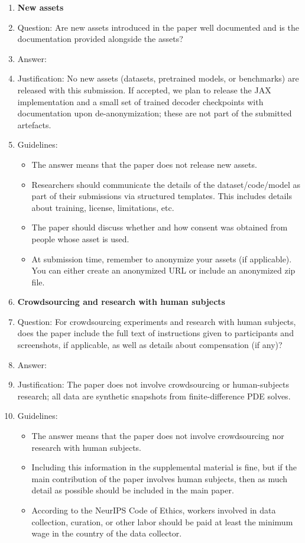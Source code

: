 \begin{enumerate}
\item {\bf New assets}
    \item[] Question: Are new assets introduced in the paper well documented and is the documentation provided alongside the assets?
    \item[] Answer: \answerNA{}
    \item[] Justification: No new assets (datasets, pretrained models, or benchmarks) are released with this submission. If accepted, we plan to release the JAX implementation and a small set of trained decoder checkpoints with documentation upon de-anonymization; these are not part of the submitted artefacts.
    \item[] Guidelines:
    \begin{itemize}
        \item The answer \answerNA{} means that the paper does not release new assets.
        \item Researchers should communicate the details of the dataset\slash code\slash model as part of their submissions via structured templates. This includes details about training, license, limitations, etc. 
        \item The paper should discuss whether and how consent was obtained from people whose asset is used.
        \item At submission time, remember to anonymize your assets (if applicable). You can either create an anonymized URL or include an anonymized zip file.
    \end{itemize}

\item {\bf Crowdsourcing and research with human subjects}
    \item[] Question: For crowdsourcing experiments and research with human subjects, does the paper include the full text of instructions given to participants and screenshots, if applicable, as well as details about compensation (if any)?
    \item[] Answer: \answerNA{}
    \item[] Justification: The paper does not involve crowdsourcing or human-subjects research; all data are synthetic snapshots from finite-difference PDE solves.
    \item[] Guidelines:
    \begin{itemize}
        \item The answer \answerNA{} means that the paper does not involve crowdsourcing nor research with human subjects.
        \item Including this information in the supplemental material is fine, but if the main contribution of the paper involves human subjects, then as much detail as possible should be included in the main paper. 
        \item According to the NeurIPS Code of Ethics, workers involved in data collection, curation, or other labor should be paid at least the minimum wage in the country of the data collector. 
    \end{itemize}


\end{enumerate}
